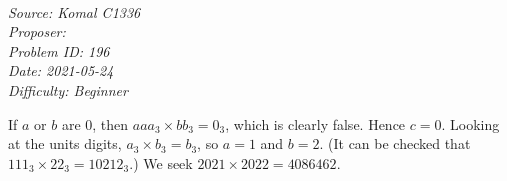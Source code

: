 \SSbreak\\
\emph{Source: Komal C1336}\\
\emph{Proposer: \Pflame}\\ %
\emph{Problem ID: 196}\\
\emph{Date: 2021-05-24}\\
\emph{Difficulty: Beginner}\\
\SSbreak

\bigskip

\begin{solution}\hfil\medskip
  
    If $a$ or $b$ are $0$, then $aaa_3 \times bb_3 = 0_3$, which is clearly false. Hence $c=0$. Looking at the units digits, $a_3 \times b_3 = b_3$, so $a=1$ and $b=2$. (It can be checked that $111_3 \times 22_3 = 10212_3$.) We seek $2021 \times 2022 = \boxed{4086462}$.
\end{solution}\bigskip
